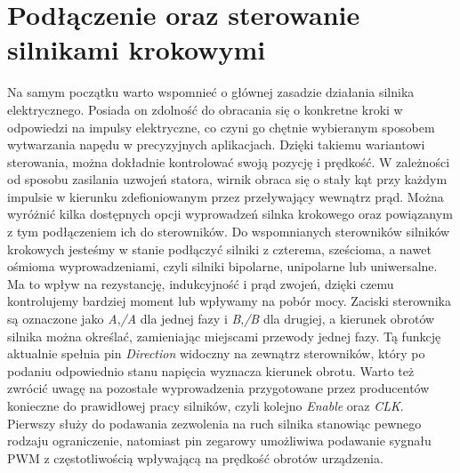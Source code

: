 \section{Podłączenie oraz sterowanie silnikami krokowymi}
Na samym początku warto wspomnieć o głównej zasadzie działania silnika elektrycznego. Posiada on zdolność do obracania się o konkretne kroki w odpowiedzi na impulsy elektryczne, co czyni go chętnie wybieranym sposobem wytwarzania napędu w precyzyjnych aplikacjach. Dzięki takiemu wariantowi sterowania, można dokładnie kontrolować swoją pozycję i prędkość. W zależności od sposobu zasilania uzwojeń statora, wirnik obraca się o stały kąt przy każdym impulsie w kierunku zdefioniowanym przez przeływający wewnątrz prąd. 
\newline
Można wyróżnić kilka dostępnych opcji wyprowadzeń silnka krokowego oraz powiązanym z tym podłączeniem ich do sterowników. Do wspomnianych sterowników silników krokowych jesteśmy w stanie podłączyć silniki z czterema, sześcioma, a nawet ośmioma wyprowadzeniami, czyli silniki bipolarne, unipolarne lub uniwersalne. Ma to wpływ na rezystancję, indukcyjność i prąd zwojeń, dzięki czemu kontrolujemy bardziej moment lub wpływamy na pobór mocy. Zaciski sterownika są oznaczone jako \textit{A},\textit{/A} dla jednej fazy i \textit{B},\textit{/B} dla drugiej, a kierunek obrotów silnika można określać, zamieniając miejscami przewody jednej fazy. Tą funkcję aktualnie spełnia pin \textit{Direction} widoczny na zewnątrz sterowników, który po podaniu odpowiednio stanu napięcia wyznacza kierunek obrotu. Warto też zwrócić uwagę na pozostałe wyprowadzenia przygotowane przez producentów konieczne do prawidłowej pracy silników, czyli kolejno \textit{Enable} oraz \textit{CLK}. Pierwszy służy do podawania zezwolenia na ruch silnika stanowiąc pewnego rodzaju ograniczenie, natomiast pin zegarowy umożliwiwa podawanie sygnału PWM z częstotliwością wpływającą na prędkość obrotów urządzenia.


